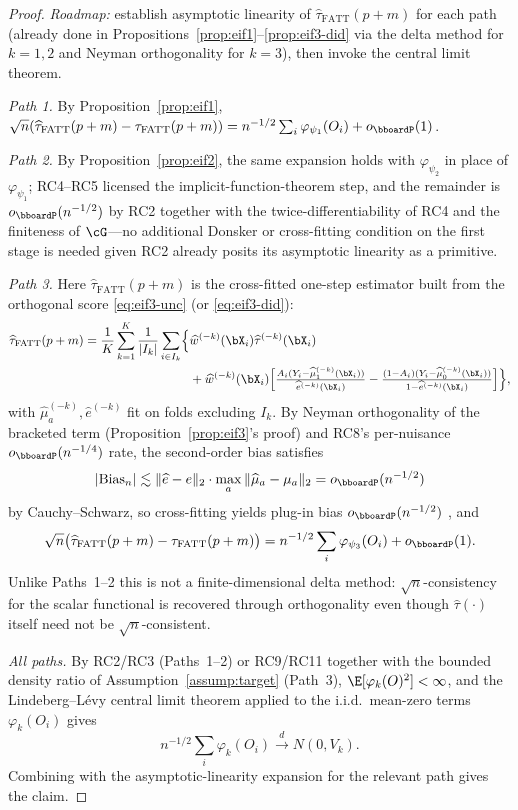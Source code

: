 \documentclass{article}
\renewcommand{\P}{\bboardP}
\begin{document}
\begin{proof}
\textit{Roadmap:} establish asymptotic linearity of $\widehat\tau_{\mathrm{FATT}}(p+m)$ for each path (already done in Propositions~\ref{prop:eif1}--\ref{prop:eif3-did} via the delta method for $k=1,2$ and Neyman orthogonality for $k=3$), then invoke the central limit theorem.

\emph{Path 1.} By Proposition~\ref{prop:eif1}, $\sqrt n(\widehat\tau_{\mathrm{FATT}}(p+m)-\tau_{\mathrm{FATT}}(p+m)) = n^{-1/2}\sum_i \varphi_{\psi_1}(O_i) + o_\P(1)$.

\emph{Path 2.} By Proposition~\ref{prop:eif2}, the same expansion holds with $\varphi_{\psi_2}$ in place of $\varphi_{\psi_1}$; RC4--RC5 licensed the implicit-function-theorem step, and the remainder is $o_\P(n^{-1/2})$ by RC2 together with the twice-differentiability of RC4 and the finiteness of $\cG$---no additional Donsker or cross-fitting condition on the first stage is needed given RC2 already posits its asymptotic linearity as a primitive.

\emph{Path 3.} Here $\widehat\tau_{\mathrm{FATT}}(p+m)$ is the cross-fitted one-step estimator built from the orthogonal score \eqref{eq:eif3-unc} (or \eqref{eq:eif3-did}):
\begin{align*}
\widehat\tau_{\mathrm{FATT}}(p+m) = \frac{1}{K}\sum_{k=1}^K \frac{1}{|I_k|}\sum_{i\in I_k}\Bigl\{&\widehat w^{(-k)}(\bX_i)\widehat\tau^{(-k)}(\bX_i) \\
&+ \widehat w^{(-k)}(\bX_i)\Bigl[\tfrac{A_i(Y_i-\widehat\mu_1^{(-k)}(\bX_i))}{\widehat e^{(-k)}(\bX_i)}-\tfrac{(1-A_i)(Y_i-\widehat\mu_0^{(-k)}(\bX_i))}{1-\widehat e^{(-k)}(\bX_i)}\Bigr]\Bigr\},
\end{align*}
with $\widehat\mu_a^{(-k)},\widehat e^{(-k)}$ fit on folds excluding $I_k$. By Neyman orthogonality of the bracketed term (Proposition~\ref{prop:eif3}'s proof) and RC8's per-nuisance $o_\P(n^{-1/4})$ rate, the second-order bias satisfies
\[
|\mathrm{Bias}_n|\lesssim \|\widehat e-e\|_2\cdot\max_a\|\widehat\mu_a-\mu_a\|_2 = o_\P(n^{-1/2})
\]
by Cauchy--Schwarz, so cross-fitting yields plug-in bias $o_\P(n^{-1/2})$ \citep{chernozhukovDoubleDebiasedMachine2018}, and
\[
\sqrt n\bigl(\widehat\tau_{\mathrm{FATT}}(p+m)-\tau_{\mathrm{FATT}}(p+m)\bigr) = n^{-1/2}\sum_i \varphi_{\psi_3}(O_i) + o_\P(1).
\]
Unlike Paths~1--2 this is not a finite-dimensional delta method: $\sqrt n$-consistency for the scalar functional is recovered through orthogonality even though $\widehat\tau(\cdot)$ itself need not be $\sqrt n$-consistent.

\emph{All paths.} By RC2/RC3 (Paths~1--2) or RC9/RC11 together with the bounded density ratio of Assumption~\ref{assump:target} (Path~3), $\E[\varphi_k(O)^2]<\infty$, and the Lindeberg--L\'evy central limit theorem applied to the i.i.d.\ mean-zero terms $\varphi_k(O_i)$ gives
\[
n^{-1/2}\sum_i \varphi_k(O_i) \overset{d}{\to} N(0,V_k).
\]
Combining with the asymptotic-linearity expansion for the relevant path gives the claim.
\end{proof}
\end{document}
